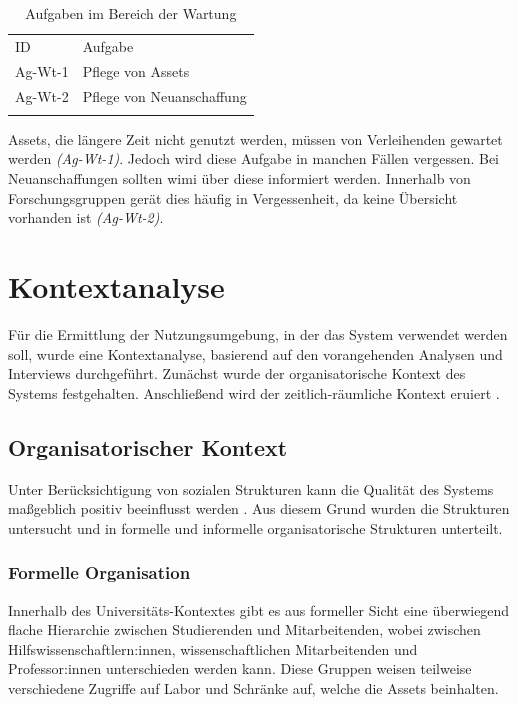 \begin{table}[h]
        \centering
        \caption{Aufgaben im Bereich der Wartung}
        \begin{tabular}{ll}
                \arrayrulecolor{maincolor}\hline
                \sffamily\color{maincolor}ID & \sffamily\color{maincolor}Aufgabe
                \\
                \arrayrulecolor{maincolor}\hline
                Ag-Wt-1                      & Pflege von Assets
                \\
                Ag-Wt-2                      & Pflege von Neuanschaffung
                \\
                \arrayrulecolor{maincolor}\hline
        \end{tabular}
        \label{table:Ag-Wt}
\end{table}

Assets, die längere Zeit nicht genutzt werden, müssen von Verleihenden gewartet
werden \textit{(Ag-Wt-1)}. Jedoch wird diese Aufgabe in manchen Fällen
vergessen. Bei Neuanschaffungen sollten \ac{wimi} über diese informiert werden.
Innerhalb von Forschungsgruppen gerät dies häufig in Vergessenheit, da keine
Übersicht vorhanden ist \textit{(Ag-Wt-2)}.


\section{Kontextanalyse}
\label{section:kontext}

Für die Ermittlung der Nutzungsumgebung, in der das System verwendet werden
soll, wurde eine Kontextanalyse, basierend auf den vorangehenden Analysen und
Interviews durchgeführt. Zunächst wurde der organisatorische Kontext des Systems
festgehalten. Anschließend wird der zeitlich-räumliche Kontext eruiert
\cite{herczeg_software-ergonomie_2018}.

\subsection{Organisatorischer Kontext}
Unter Berücksichtigung von sozialen Strukturen kann die Qualität des Systems
maßgeblich positiv beeinflusst werden \cite{herczeg_software-ergonomie_2018}.
Aus diesem Grund wurden die Strukturen untersucht und in formelle und informelle
organisatorische Strukturen unterteilt.

\subsubsection{Formelle Organisation}
Innerhalb des Universitäts-Kontextes gibt es aus formeller Sicht eine
überwiegend flache Hierarchie zwischen Studierenden und Mitarbeitenden, wobei
zwischen Hilfswissenschaftlern:innen, wissenschaftlichen Mitarbeitenden und
Professor:innen unterschieden werden kann. Diese Gruppen weisen teilweise
verschiedene Zugriffe auf Labor und Schränke auf, welche die Assets beinhalten.

